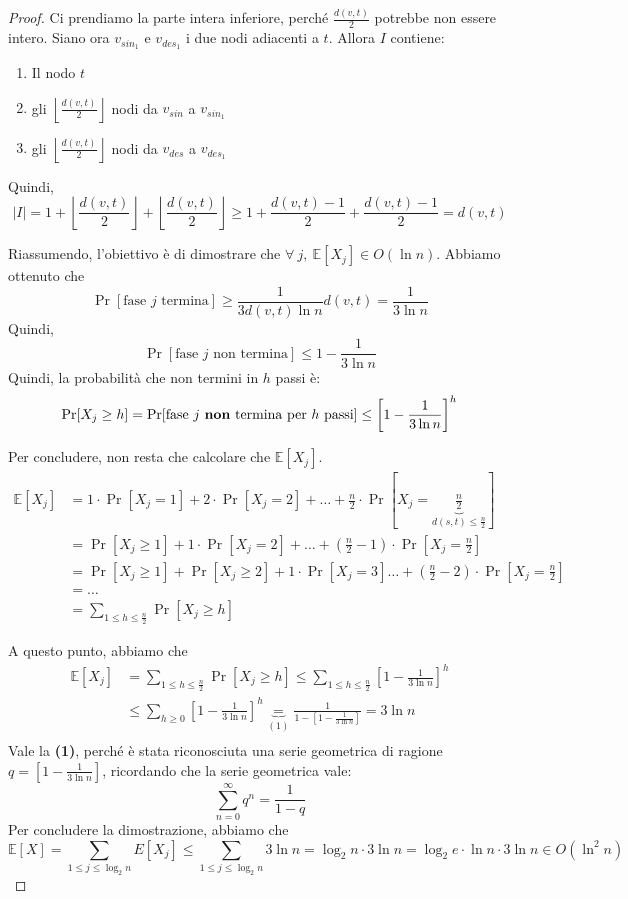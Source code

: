 \begin{proof}
Ci prendiamo la parte intera inferiore, perché $\frac{d(v, t)}{2}$ potrebbe non essere intero. 
Siano ora $v_{sin_1}$ e $v_{des_1}$ i due nodi adiacenti a $t$. 
Allora $I$ contiene:
\begin{enumerate}
    \item Il nodo $t$
    \item gli $\left\lfloor\frac{d(v, t)}{2}\right\rfloor$ nodi da $v_{sin}$ a $v_{sin_1}$
    \item gli $\left\lfloor\frac{d(v, t)}{2}\right\rfloor$ nodi da $v_{des}$ a $v_{des_1}$
\end{enumerate}
Quindi,
\[
|I| = 1 + \left\lfloor\frac{d(v, t)}{2}\right\rfloor + \left\lfloor\frac{d(v, t)}{2}\right\rfloor 
\geq 1 + \frac{d(v, t) - 1}{2} + \frac{d(v, t) - 1}{2} = d(v, t)
\]

Riassumendo, l'obiettivo è di dimostrare che $\forall\ j,\ \mathbb{E}[X_j] \in O(\ln n)$.
Abbiamo ottenuto che 
\[
\Pr[\text{fase $j$ termina}] \geq \frac{1}{3d(v, t)\ln n} d(v, t) = \frac{1}{3 \ln n} 
\]
Quindi, 
\[
\Pr[\text{fase $j$ non termina}] \leq 1 - \frac{1}{3 \ln n}
\]
Quindi, la probabilità che non termini in $h$ passi è:
\[
\Pr[X_j \geq h] = \Pr[\text{fase $j$ \textbf{non} termina per $h$ passi}] \leq \left[1 - \frac{1}{3 \ln n}\right]^h 
\]

Per concludere, non resta che calcolare che $\mathbb{E}[X_j]$.
\begin{align*}
\mathbb{E}[X_j] &= 1 \cdot \Pr[X_j = 1] + 2 \cdot \Pr[X_j = 2] + \dots + \frac{n}{2} \cdot \Pr[X_j = \underbrace{\frac{n}{2}}_{d(s, t) \leq \frac{n}{2}}] \\
&= \Pr[X_j \geq 1] + 1 \cdot \Pr[X_j = 2] + \dots + (\frac{n}{2} - 1) \cdot \Pr[X_j = \frac{n}{2}] \\
&= \Pr[X_j \geq 1] + \Pr[X_j \geq 2] + 1 \cdot \Pr[X_j = 3] \dots + (\frac{n}{2} - 2) \cdot \Pr[X_j = \frac{n}{2}] \\
&=\dots \\
&= \sum_{1 \leq h \leq \frac{n}{2}} \Pr[X_j \geq h]
\end{align*}

A questo punto, abbiamo che
\begin{align*}
\mathbb{E}[X_j] &= \sum_{1 \leq h \leq \frac{n}{2}} \Pr[X_j \geq h] \leq \sum_{1 \leq h \leq \frac{n}{2}} \left[1 - \frac{1}{3 \ln n}\right]^h \\
& \leq \sum_{h \geq 0} \left[1 - \frac{1}{3 \ln n}\right]^h \underbrace{=}_{(1)} \frac{1}{1 - \left[1 - \frac{1}{3 \ln n}\right]} = 3 \ln n \\
\end{align*}
Vale la \textbf{(1)}, perché è stata riconosciuta una serie geometrica di ragione $q = \left[1 - \frac{1}{3 \ln n}\right]$, ricordando che la serie geometrica vale:
\[
\sum_{n = 0}^{\infty} q^n = \frac{1}{1 - q}
\]
Per concludere la dimostrazione, abbiamo che
\[
\mathbb{E}[X] = \sum_{1 \leq j \leq \log_2n} E[X_j] \leq \sum_{1 \leq j \leq \log_2n} 3 \ln n = \log_2 n \cdot 3 \ln n = \log_2 e \cdot \ln n \cdot 3 \ln n \in O(\ln^2 n) 
\]
\end{proof}

